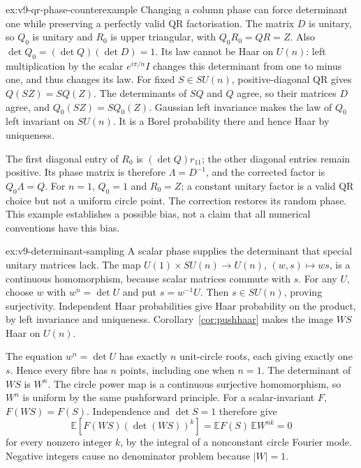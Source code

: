 \begin{solution}{ex:v9-qr-phase-counterexample}
\idea Changing a column phase can force determinant one while preserving
a perfectly valid QR factorisation.
\writeup The matrix $D$ is unitary, so $Q_0$ is unitary and $R_0$ is
upper triangular, with $Q_0R_0=QR=Z$.
Also $\det Q_0=(\det Q)(\det D)=1$.
Its law cannot be Haar on $U(n)$: left multiplication by the scalar
$e^{i\pi/n}I$ changes this determinant from one to minus one, and thus
changes its law.
For fixed $S\in SU(n)$, positive-diagonal QR gives $Q(SZ)=SQ(Z)$.
The determinants of $SQ$ and $Q$ agree, so their matrices $D$ agree,
and $Q_0(SZ)=S Q_0(Z)$.
Gaussian left invariance makes the law of $Q_0$ left invariant on $SU(n)$.
It is a Borel probability there and hence Haar by uniqueness.

The first diagonal entry of $R_0$ is $(\det Q)r_{11}$;
the other diagonal entries remain positive.
Its phase matrix is therefore $\Lambda=D^{-1}$, and the corrected
factor is $Q_0\Lambda=Q$.
For $n=1$, $Q_0=1$ and $R_0=Z$; a constant unitary factor is a valid
QR choice but not a uniform circle point. The correction restores its
random phase. This example establishes a possible bias, not a claim
that all numerical conventions have this bias.
\end{solution}
\begin{solution}{ex:v9-determinant-sampling}
\idea A scalar phase supplies the determinant that special unitary matrices
lack.
\writeup The map $U(1)\times SU(n)\to U(n)$, $(w,s)\mapsto ws$,
is a continuous homomorphism, because scalar matrices commute with $s$.
For any $U$, choose $w$ with $w^n=\det U$ and put $s=w^{-1}U$.
Then $s\in SU(n)$, proving surjectivity.
Independent Haar probabilities give Haar probability on the product,
by left invariance and uniqueness. Corollary~\ref{cor:pushhaar} makes
the image $WS$ Haar on $U(n)$.

The equation $w^n=\det U$ has exactly $n$ unit-circle roots, each giving
exactly one $s$. Hence every fibre has $n$ points, including one when
$n=1$. The determinant of $WS$ is $W^n$.
The circle power map is a continuous surjective homomorphism, so $W^n$
is uniform by the same pushforward principle.
For a scalar-invariant $F$, $F(WS)=F(S)$.
Independence and $\det S=1$ therefore give
\[
 \mathbb E[F(WS)(\det(WS))^k]
 =\mathbb EF(S)\,\mathbb EW^{nk}=0
\]
for every nonzero integer $k$, by the integral of a nonconstant circle
Fourier mode. Negative integers cause no denominator problem because
$|W|=1$.
\end{solution}
